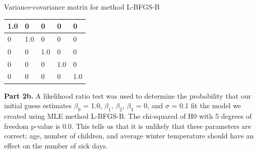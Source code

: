 \documentclass[letterpaper,12pt]{article}
\theoremstyle{definition}
\begin{document}
\begin{center}
    \caption{Variance-covariance matrix for method L-BFGS-B}
    \begin{tabular}{ | p{1cm}| p{1cm}| p{1cm}| p{1cm}| p{1cm}|}
    \hline
    1.0 & 0 & 0 & 0 & 0  \\ \hline
     0 & 1.0 & 0 & 0 & 0  \\ \hline
     0 & 0 & 1.0 & 0 & 0  \\ \hline
     0 & 0 & 0 & 1.0 & 0  \\ \hline
     0 & 0 & 0 & 0 & 1.0  \\ \hline
    \end{tabular}
\end{center}

\noindent\newline\textbf{Part 2b.} A likelihood ratio test was used to determine the probability that our initial guess estimates $\beta_{0}$ = 1.0, $\beta_{1}$, $\beta_{2}$, $\beta_{3}$ = 0, and $\sigma$  = 0.1 fit the model we created using MLE method L-BFGS-B. The chi-squared of H0 with 5 degrees of freedom p-value is 0.0. This tells us that it is unlikely that these parameters are correct: age, number of children, and average winter temperature should have an effect on the number of sick days.
\end{document}
